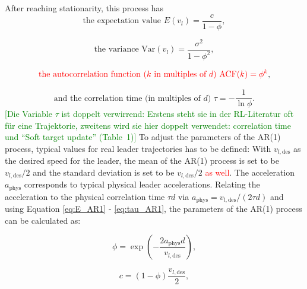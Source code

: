 \documentclass[review]{elsarticle}
\providecommand{\red}[1]{\textcolor{red}{#1}}
\providecommand{\green}[1]{\textcolor{green}{#1}}
\providecommand{\martin}[1]{\red{#1}} %
\providecommand{\martinc}[1]{\green{[#1]}} %
\providecommand{\sub}[1]{_{\mathrm{#1}}}  %
\providecommand{\3}{{\ss}}
\begin{document}
After reaching stationarity, this process has 
\begin{equation}
\label{eq:E_AR1}
\text{the expectation value }E(v_l) = \frac{c}{1-\phi}, 
\end{equation}

\begin{equation}
\label{eq:V_AR1}
\text{the variance }\text{Var}(v_l) = \frac{\sigma^2}{1-\phi^2}, 
\end{equation}

\begin{equation}
\label{eq:ACF_AR1}
\martin{\text{the autocorrelation function ($k$ in multiples of $d$) }
\text{ACF}(k) = \phi^{k}}, 
\end{equation}

\begin{equation}
\label{eq:tau_AR1}
\text{and the correlation time (in multiples of $d$) }\tau = -\frac{1}{\ln \phi}. 
\end{equation}
 \martinc{Die Variable $\tau$ ist doppelt verwirrend: Erstens steht sie
   in der RL-Literatur oft f\"ur eine Trajektorie, zweitens wird sie
   hier doppelt verwendet: correlation time und ``Soft target update'' (Table~1)}
To adjust the parameters of the AR(1) process, typical values for real
leader trajectories has to be defined: With $v_{l,\text{des}}$ as the
desired speed for the leader, the mean of the AR(1) process is set to
be $v_{l,\text{des}}/2$ and the standard deviation is set to be
$v_{l,\text{des}}/2$ \martin{as well}. The acceleration $a\sub{phys}$ corresponds to
typical physical leader accelerations. Relating the acceleration to
the physical correlation time $\tau d$ via 
$a\sub{phys}=v_{l,\text{des}}/(2\tau d)$  and using Equation \eqref{eq:E_AR1} - \eqref{eq:tau_AR1}, the parameters of the AR(1) process can be calculated as:

\begin{equation}
\phi = \exp\left(-\frac{2a\sub{phys}d}{v_{l,\text{des}}}\right),
\end{equation}

\begin{equation}
c=(1-\phi)\frac{v_{l,\text{des}}}{2},
\end{equation}
\end{document}
